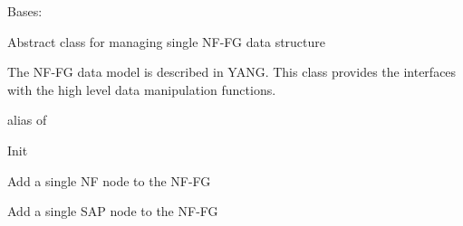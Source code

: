 \documentclass[letterpaper,10pt,english]{sphinxmanual}
\begin{document}
\begin{fulllineitems}
\label{util/nffg:escape.util.nffg.AbstractNFFG}
Bases: \href{https://docs.python.org/2.7/library/functions.html\#object}{}

Abstract class for managing single NF-FG data structure

The NF-FG data model is described in YANG.  This class provides the
interfaces with the high level data manipulation functions.

\begin{fulllineitems}
\label{util/nffg:escape.util.nffg.AbstractNFFG.__metaclass__}
alias of 

\end{fulllineitems}


\begin{fulllineitems}
\label{util/nffg:escape.util.nffg.AbstractNFFG.__init__}
Init

\end{fulllineitems}


\begin{fulllineitems}
\label{util/nffg:escape.util.nffg.AbstractNFFG.add_nf}
Add a single NF node to the NF-FG

\end{fulllineitems}


\begin{fulllineitems}
\label{util/nffg:escape.util.nffg.AbstractNFFG.add_sap}
Add a single SAP node to the NF-FG

\end{fulllineitems}



\end{fulllineitems}
\end{document}
